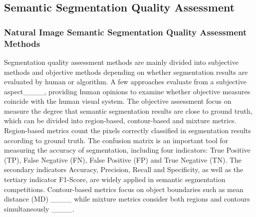 \subsection{Semantic Segmentation Quality Assessment}\label{section ml}
\subsubsection{Natural Image Semantic Segmentation Quality Assessment Methods}\label{section nml}
Segmentation quality assessment methods are mainly divided into subjective methods and objective methods depending on whether segmentation results are evaluated by human or algorithm. 
A few approaches evaluate from a subjective aspect____, providing human opinions to examine whether objective measures coincide with the human visual system. The objective assessment focus on measure the degree that semantic segmentation results are close to ground truth, which can be divided into region-based, contour-based and mixture metrics. Region-based metrics count the pixels correctly classified in segmentation results according to ground truth. 
The confusion matrix is an important tool for measuring the accuracy of segmentation, including four indicators: True Positive (TP), False Negative (FN), False Positive (FP) and True Negative (TN). The secondary indicators Accuracy, Precision, Recall and Specificity, as well as the tertiary indicator F1-Score, are widely applied in semantic segmentation competitions.
Contour-based metrics focus on object boundaries such as  mean distance (MD) ____ while mixture metrics consider both regions and contours simultaneously ____.


